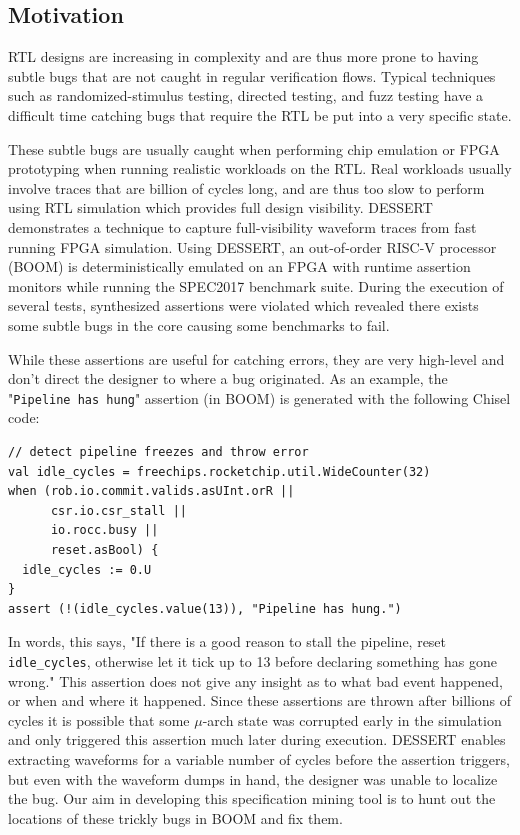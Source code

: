 \documentclass[acmlarge,11pt,nonacm]{acmart}
\begin{document}
\subsection{Motivation}
RTL designs are increasing in complexity and are thus more prone to having subtle bugs that are not caught in regular verification flows. Typical techniques such as randomized-stimulus testing, directed testing, and fuzz testing have a difficult time catching bugs that require the RTL be put into a very specific state.

These subtle bugs are usually caught when performing chip emulation or FPGA prototyping when running realistic workloads on the RTL.
Real workloads usually involve traces that are billion of cycles long, and are thus too slow to perform using RTL simulation which provides full design visibility.
DESSERT\cite{Kim_2018} demonstrates a technique to capture full-visibility waveform traces from fast running FPGA simulation.
Using DESSERT, an out-of-order RISC-V processor (BOOM\cite{Celio_2015}) is deterministically emulated on an FPGA with runtime assertion monitors while running the SPEC2017 benchmark suite.
During the execution of several tests, synthesized assertions were violated which revealed there exists some subtle bugs in the core causing some benchmarks to fail.

While these assertions are useful for catching errors, they are very high-level and don't direct the designer to where a bug originated.
As an example, the "\texttt{Pipeline has hung}" assertion (in BOOM) is generated with the following Chisel code:

\begin{verbatim}
// detect pipeline freezes and throw error
val idle_cycles = freechips.rocketchip.util.WideCounter(32)
when (rob.io.commit.valids.asUInt.orR ||
      csr.io.csr_stall ||
      io.rocc.busy ||
      reset.asBool) {
  idle_cycles := 0.U
}
assert (!(idle_cycles.value(13)), "Pipeline has hung.")
\end{verbatim}

In words, this says, "If there is a good reason to stall the pipeline, reset \texttt{idle\_cycles}, otherwise let it tick up to 13 before declaring something has gone wrong."
This assertion does not give any insight as to what bad event happened, or when and where it happened.
Since these assertions are thrown after billions of cycles it is possible that some $\mu$-arch state was corrupted early in the simulation and only triggered this assertion much later during execution.
DESSERT enables extracting waveforms for a variable number of cycles before the assertion triggers, but even with the waveform dumps in hand, the designer was unable to localize the bug.
Our aim in developing this specification mining tool is to hunt out the locations of these trickly bugs in BOOM and fix them.
\end{document}
